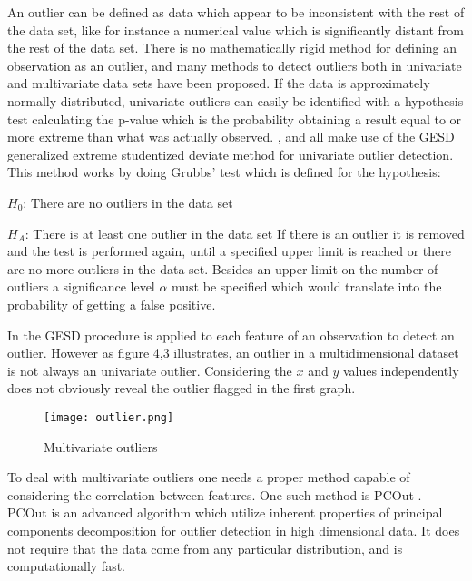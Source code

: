 An outlier can be defined as data which appear to be inconsistent with the rest of the data set, like for instance a numerical value which is significantly distant from the rest of the data set. There is no mathematically rigid method for defining an observation as an outlier, and many methods to detect outliers both in univariate and multivariate data sets have been proposed. If the data is approximately normally distributed, univariate outliers can easily be identified with a hypothesis test calculating the p-value which is the probability obtaining a result equal to or more extreme than what was actually observed. \cite{faultdetec2}, \cite{faultdetec3} and \cite{faultdetec4} all make use of the GESD generalized extreme studentized deviate method for univariate outlier detection. This method works by doing Grubbs’ test which is defined for the hypothesis:
\newline

$H_0$: There are no outliers in the data set
\newline

$H_A$: There is at least one outlier in the data set 
\newline
\newline
If there is an outlier it is removed and the test is performed again, until a specified upper limit is reached or there are no more outliers in the data set. Besides an upper limit on the number of outliers a significance level $\alpha$ must be specified which would translate into the probability of getting a false positive. 

In \cite{faultdetec2} the GESD procedure is applied to each feature of an observation to detect an outlier. However as figure 4,3 illustrates, an outlier in a multidimensional dataset is not always an univariate outlier. Considering the $x$ and $y$ values independently does not obviously reveal the outlier flagged in the first graph. 
\begin{figure}
\texttt{[image: outlier.png]}
\caption{Multivariate outliers}
\end{figure}
To deal with multivariate outliers one needs a proper method capable of considering the correlation between features. One such method is PCOut \cite{OutDetec1}. PCOut is an advanced algorithm which utilize inherent properties of principal components decomposition for outlier detection in high dimensional data. It does not require that the data come from any particular distribution, and is computationally fast.
